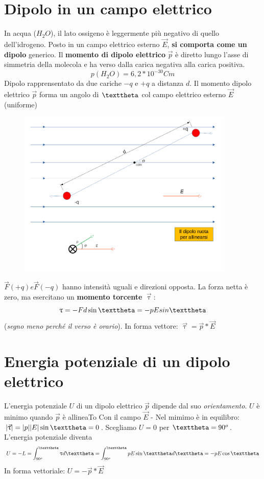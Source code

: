 \section{Dipolo in un campo elettrico}
In acqua ($H_2O$), il lato ossigeno è leggermente più negativo di quello dell'idrogeno. Posto in un campo
elettrico esterno $\vec{E}$, \textbf{si comporta come un dipolo} generico. Il \textbf{momento di dipolo elettrico} $\vec{p}$ è diretto lungo l'asse di simmetria della molecola e ha verso dalla carica negativa alla carica positiva.
\begin{equation}
  p(H_2O)=6,2*10^{-30}Cm
\end{equation}
Dipolo rapprensentato da due cariche $-q$ e $+q$ a distanza $d$. Il momento dipolo elettrico
$\vec{p}$ forma un angolo di $\texttheta$ col campo elettrico esterno $\vec{E}$ (uniforme)\\
\begin{figure}[!h]
 	\centering
	\includegraphics[height=8cm]{img/grafuci del dipolo elettrico.png}
\end{figure}
$\vec{F} (+q) e \vec{F} (-q)$ hanno intensità uguali e direzioni opposta. La forza netta è zero, ma esercitano un \textbf{momento torcente} $\vec{\uptau}$:
\begin{equation}
\uptau=-Fd \sin {\texttheta} = -pE sin {\texttheta}
\end{equation}
(\textit{segno meno perché il verso è orario}).
In forma vettore: $\vec{\uptau}=\vec{p}*\vec{E}$
\section{Energia potenziale di un dipolo elettrico}
L'energia potenziale $U$ di un dipolo elettrico $\vec{p}$ dipende dal suo \textit{orientamento}.
$U$ è minimo quando $\vec{p}$ è allineaTo Con il campo $\vec{E}$ - Nel mimimo è in equilibro:
$\abs{\vec{\uptau}}=\abs{p}\abs{E}\sin \texttheta=0$. Scegliamo $U=0$ per $\texttheta=90^o$.\\
L'energia potenziale diventa
\begin{equation}
  U=-L=\int^{\texttheta}_{90^o}\uptau d \texttheta= \int^{\texttheta}_{90^o} pE\sin \texttheta d\texttheta =-pE\cos\texttheta
\end{equation}
In forma vettoriale: $U=-\vec{p}*\vec{E}$
